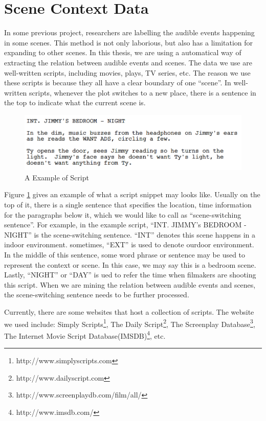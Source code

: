 \section{Scene Context Data}
In some previous project, researchers are labelling the audible events happening in some scenes. 
This method is not only laborious, but also has a limitation for expanding to other scenes.
In this thesis, we are using a automatical way of extracting the relation between audible events and scenes.
The data we use are well-written scripts, including movies, plays, TV series, etc. 
The reason we use these scripts is because they all have a clear boundary of one ``scene''. 
In well-written scripts, whenever the plot switches to a new place, there is a sentence in the top to indicate what the current scene is. 
\begin{figure}[htb]
\centering
\includegraphics[scale=0.6]{figure/dataprep/script}
\caption{A Example of Script}
\label{fig:script}
\end{figure}

Figure \ref{fig:script} gives an example of what a script snippet may looks like. Usually on the top of it, there is a single sentence that specifies the location, time information for the paragraphs below it, which we would like to call as ``scene-switching sentence''. 
For example, in the example script, ``INT. JIMMY's BEDROOM - NIGHT'' is the scene-switching sentence. 
``INT'' denotes this scene happens in a indoor environment. 
sometimes, ``EXT'' is used to denote ourdoor environment. 
In the middle of this sentence, some word phrase or sentence may be used to represent the context or scene. 
In this case, we may say this is a bedroom scene. 
Lastly, ``NIGHT'' or ``DAY'' is ued to refer the time when filmakers are shooting this script. 
When we are mining the relation between audible events and scenes, the scene-switching sentence needs to be further processed. 

Currently, there are some websites that host a collection of scripts. 
The website we used include: Simply Scripts\footnote{http://www.simplyscripts.com}, The Daily Script\footnote{http://www.dailyscript.com}, The Screenplay Database\footnote{http://www.screenplaydb.com/film/all/}, The Internet Movie Script Database(IMSDB)\footnote{http://www.imsdb.com/}, etc. 


